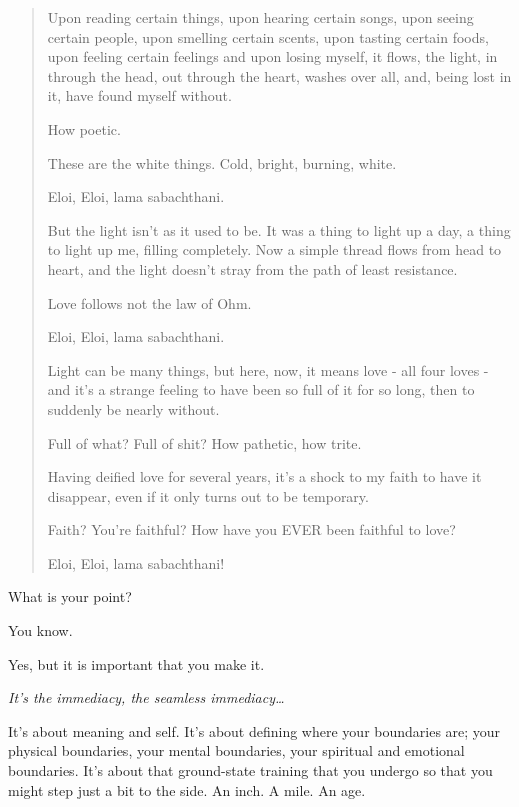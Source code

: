 \begin{paracol}{2}
\begin{leftcolumn}
\begin{quotation}
Upon reading certain things, upon hearing certain songs, upon seeing certain people, upon smelling certain scents, upon tasting certain foods, upon feeling certain feelings and upon losing myself, it flows, the light, in through the head, out through the heart, washes over all, and, being lost in it, have found myself without.

\begin{ally}
How poetic.
\end{ally}
\noindent These are the white things. Cold, bright, burning, white.

Eloi, Eloi, lama sabachthani.

But the light isn't as it used to be. It was a thing to light up a day, a thing to light up me, filling completely. Now a simple thread flows from head to heart, and the light doesn't stray from the path of least resistance.

\begin{ally}
Love follows not the law of Ohm.
\end{ally}
\noindent Eloi, Eloi, lama sabachthani.

Light can be many things, but here, now, it means love - all four loves - and it's a strange feeling to have been so full of it for so long, then to suddenly be nearly without.

\begin{ally}
Full of what? Full of shit? How pathetic, how trite.
\end{ally}
\noindent Having deified love for several years, it's a shock to my faith to have it disappear, even if it only turns out to be temporary.

\begin{ally}
Faith? You're faithful? How have you EVER been faithful to love?
\end{ally}
\noindent Eloi, Eloi, lama sabachthani!
\end{quotation}
\newpage

\begin{ally}
What is your point?
\end{ally}
\noindent You know.

\begin{ally}
Yes, but it is important that you make it.
\end{ally}
\emph{It's the immediacy, the seamless immediacy\ldots{}}

It's about meaning and self. It's about defining where your boundaries are; your physical boundaries, your mental boundaries, your spiritual and emotional boundaries. It's about that ground-state training that you undergo so that you might step just a bit to the side. An inch. A mile. An age.


\end{leftcolumn}
\end{paracol}
